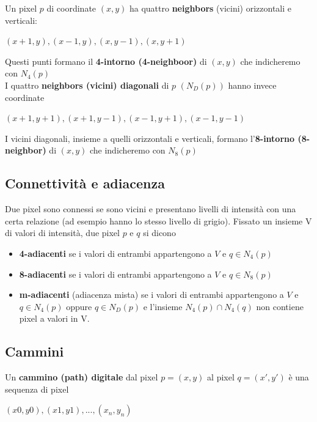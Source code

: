Un pixel $p$ di coordinate $(x,y)$ ha quattro \textbf{neighbors} (vicini) orizzontali e verticali:

\begin{center}
    $(x+1, y), (x-1, y), (x, y-1), (x, y+1)$
\end{center}

Questi punti formano il \textbf{4-intorno (4-neighboor)} di $(x,y)$ che indicheremo con $N_4(p)$
\\I quattro \textbf{neighbors (vicini) diagonali} di $p$ $(N_D(p))$ hanno invece coordinate

\begin{center}
    $(x+1, y+1), (x+1,y-1), (x-1, y+1), (x-1, y-1)$
\end{center}

I vicini diagonali, insieme a quelli orizzontali e verticali, formano l'\textbf{8-intorno (8-neighbor)} di $(x,y)$  che indicheremo con $N_8(p)$

\subsection{Connettività e adiacenza}

Due pixel sono connessi se sono vicini e presentano livelli di intensità con una certa relazione (ad esempio hanno lo stesso livello di grigio).
Fissato un insieme V di valori di intensità, due pixel $p$ e $q$ si dicono

\begin{itemize}
    \item \textbf{4-adiacenti} se i valori di entrambi appartengono a $V$ e $q \in N_4(p)$
    \item \textbf{8-adiacenti} se i valori di entrambi appartengono a $V$ e $q \in N_8(p)$
    \item \textbf{m-adiacenti} (adiacenza mista) se i valori di entrambi appartengono a $V$ e $q \in N_4(p)$ oppure $q \in N_D(p)$ e l'insieme $N_4(p) \cap N_4(q)$ non contiene pixel a valori in V.
\end{itemize}

\subsection{Cammini}

Un \textbf{cammino (path) digitale} dal pixel $p = (x,y)$ al pixel $q = (x',
    y')$ è una sequenza di pixel

\begin{center}
    $(x0, y0), (x1, y1), ... ,(x_n, y_n)$
\end{center}


